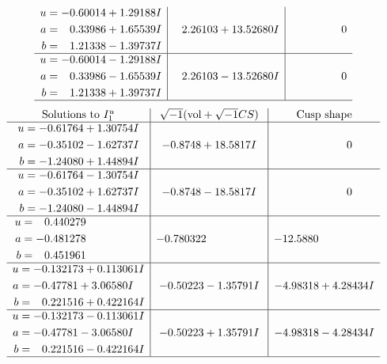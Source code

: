 \documentclass[1p]{elsarticle_modified}
\theoremstyle{definition}
\newcommand{\I}{\sqrt{-1}}
\begin{document}
$$\begin{array}{c|c|c}
\begin{aligned}
u &= -0.60014 + 1.29188 I \\
a &= \phantom{-}0.33986 + 1.65539 I \\
b &= \phantom{-}1.21338 - 1.39737 I\end{aligned}
 & \phantom{-}2.26103 + 13.52680 I & \phantom{-0.000000 } 0 \\ \hline\begin{aligned}
u &= -0.60014 - 1.29188 I \\
a &= \phantom{-}0.33986 - 1.65539 I \\
b &= \phantom{-}1.21338 + 1.39737 I\end{aligned}
 & \phantom{-}2.26103 - 13.52680 I & \phantom{-0.000000 } 0\\
 \hline 
 \end{array}$$\newpage$$\begin{array}{c|c|c}  
\text{Solutions to }I^u_{1}& \I (\text{vol} + \sqrt{-1}CS) & \text{Cusp shape}\\
 \hline 
\begin{aligned}
u &= -0.61764 + 1.30754 I \\
a &= -0.35102 - 1.62737 I \\
b &= -1.24080 + 1.44894 I\end{aligned}
 & -0.8748 + 18.5817 I & \phantom{-0.000000 } 0 \\ \hline\begin{aligned}
u &= -0.61764 - 1.30754 I \\
a &= -0.35102 + 1.62737 I \\
b &= -1.24080 - 1.44894 I\end{aligned}
 & -0.8748 - 18.5817 I & \phantom{-0.000000 } 0 \\ \hline\begin{aligned}
u &= \phantom{-}0.440279\phantom{ +0.000000I} \\
a &= -0.481278\phantom{ +0.000000I} \\
b &= \phantom{-}0.451961\phantom{ +0.000000I}\end{aligned}
 & -0.780322\phantom{ +0.000000I} & -12.5880\phantom{ +0.000000I} \\ \hline\begin{aligned}
u &= -0.132173 + 0.113061 I \\
a &= -0.47781 + 3.06580 I \\
b &= \phantom{-}0.221516 + 0.422164 I\end{aligned}
 & -0.50223 - 1.35791 I & -4.98318 + 4.28434 I \\ \hline\begin{aligned}
u &= -0.132173 - 0.113061 I \\
a &= -0.47781 - 3.06580 I \\
b &= \phantom{-}0.221516 - 0.422164 I\end{aligned}
 & -0.50223 + 1.35791 I & -4.98318 - 4.28434 I\\
 \hline 
 \end{array}$$\newpage\newpage\renewcommand{\arraystretch}{1}
\end{document}
